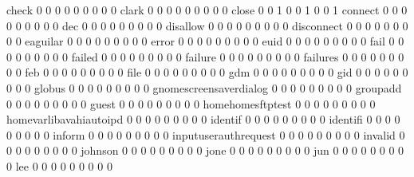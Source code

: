 \documentclass[compress,8pt]{beamer}
\begin{document}
\begin{frame}
\begin{Schunk}
  check                                      0   0   0   0   0   0   0   0   0
  clark                                      0   0   0   0   0   0   0   0   0
  close                                      0   0   1   0   0   1   0   0   1
  connect                                    0   0   0   0   0   0   0   0   0
  dec                                        0   0   0   0   0   0   0   0   0
  disallow                                   0   0   0   0   0   0   0   0   0
  disconnect                                 0   0   0   0   0   0   0   0   0
  eaguilar                                   0   0   0   0   0   0   0   0   0
  error                                      0   0   0   0   0   0   0   0   0
  euid                                       0   0   0   0   0   0   0   0   0
  fail                                       0   0   0   0   0   0   0   0   0
  failed                                     0   0   0   0   0   0   0   0   0
  failure                                    0   0   0   0   0   0   0   0   0
  failures                                   0   0   0   0   0   0   0   0   0
  feb                                        0   0   0   0   0   0   0   0   0
  file                                       0   0   0   0   0   0   0   0   0
  gdm                                        0   0   0   0   0   0   0   0   0
  gid                                        0   0   0   0   0   0   0   0   0
  globus                                     0   0   0   0   0   0   0   0   0
  gnomescreensaverdialog                     0   0   0   0   0   0   0   0   0
  groupadd                                   0   0   0   0   0   0   0   0   0
  guest                                      0   0   0   0   0   0   0   0   0
  homehomesftptest                           0   0   0   0   0   0   0   0   0
  homevarlibavahiautoipd                     0   0   0   0   0   0   0   0   0
  identif                                    0   0   0   0   0   0   0   0   0
  identifi                                   0   0   0   0   0   0   0   0   0
  inform                                     0   0   0   0   0   0   0   0   0
  inputuserauthrequest                       0   0   0   0   0   0   0   0   0
  invalid                                    0   0   0   0   0   0   0   0   0
  johnson                                    0   0   0   0   0   0   0   0   0
  jone                                       0   0   0   0   0   0   0   0   0
  jun                                        0   0   0   0   0   0   0   0   0
  lee                                        0   0   0   0   0   0   0   0   0

\end{Schunk}
\end{frame}
\end{document}
